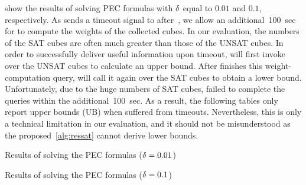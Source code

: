 show the results of solving PEC formulas with $\delta$ equal to $0.01$ and $0.1$, respectively.
As \benchexec sends a timeout signal to \ressat after~\timelimit,
we allow an additional~\SI{100}{sec} for \ressat to compute the weights of the collected cubes.
In our evaluation, the numbers of the SAT cubes are often much greater than those of the UNSAT cubes.
In order to successfully deliver useful information upon timeout,
\ressat will first invoke \cachet over the UNSAT cubes to calculate an upper bound.
After \cachet finishes this weight-computation query,
\ressat will call it again over the SAT cubes to obtain a lower bound.
Unfortunately, due to the huge numbers of SAT cubes,
\cachet failed to complete the queries within the additional~\SI{100}{sec}.
As a result, the following tables only report upper bounds (UB) when \ressat suffered from timeouts.
Nevertheless, this is only a technical limitation in our evaluation,
and it should not be misunderstood as the proposed~\cref{alg:ressat} cannot derive lower bounds.

\begin{table}[ht]
    \centering
    \footnotesize
    \caption{Results of solving the PEC formulas ($\delta=0.01$)}
    \label{tbl:random-exist-ssat-pec-0.01}
\end{table}

\begin{table}[ht]
    \centering
    \footnotesize
    \caption{Results of solving the PEC formulas ($\delta=0.1$)}
    \label{tbl:random-exist-ssat-pec-0.10}
\end{table}

